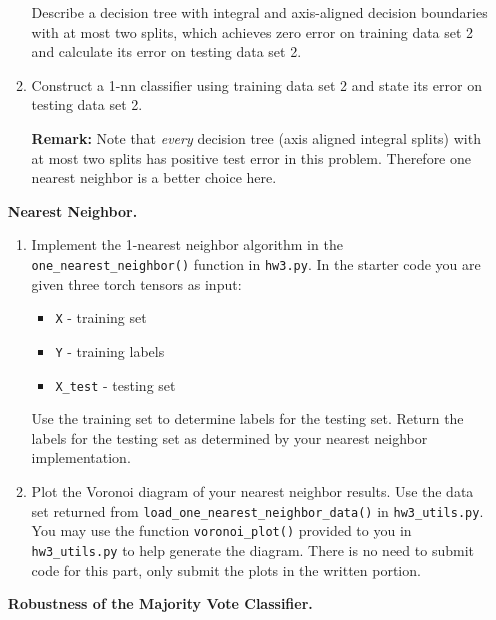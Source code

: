 \begin{enumerate}[font={\Large\bfseries},left=0pt]
\begin{Q}
\begin{enumerate}
              Describe a decision tree with integral and axis-aligned decision boundaries with at most two splits, which achieves zero error on training data set 2 and calculate its error on testing data set 2.
              
              \item Construct a 1-nn classifier using training data set 2 and state its error on testing data set 2.
              
              
              \textbf{Remark:} Note that \emph{every} decision tree (axis aligned integral splits) with at most two splits has positive test error in this problem. Therefore one nearest neighbor is a better choice here.
          
            
            
            
            \end{enumerate}
          \end{Q}



          \begin{Q}
    	  \textbf{\Large Nearest Neighbor.}

          \begin{enumerate}
          \item Implement the 1-nearest neighbor algorithm in the \texttt{one\_nearest\_neighbor()} function in \texttt{hw3.py}. In the starter code you are given three torch tensors as input:
    	\begin{itemize}
    	  \item \texttt{X} - training set
    	  \item \texttt{Y} - training labels
          \item \texttt{X\_test} - testing set
          \end{itemize}
          Use the training set to determine labels for the testing set. Return the labels for the testing set as determined by your nearest neighbor implementation.
          \item Plot the Voronoi diagram of your nearest neighbor results. Use the data set returned from \texttt{load\_one\_nearest\_neighbor\_data()} in \texttt{hw3\_utils.py}. You may use the function \texttt{voronoi\_plot()} provided to you in \texttt{hw3\_utils.py} to help generate the diagram.  There is no need to submit code for this part, only submit the plots in the written portion.
          \end{enumerate}
          \end{Q}
\begin{Q}
   \textbf{\Large Robustness of the Majority Vote Classifier.}\\
   \def\maj{\textsc{Maj}}


\end{Q}
\end{enumerate}
